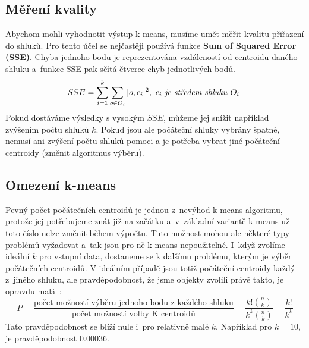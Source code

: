 \subsection{Měření kvality}
Abychom mohli vyhodnotit výstup k-means, musíme umět měřit kvalitu přiřazení do shluků. Pro tento účel se nejčastěji používá funkce \textbf{Sum of Squared Error (SSE)}. Chyba jednoho bodu je reprezentována vzdáleností od centroidu daného shluku a~funkce SSE pak sčítá čtverce chyb jednotlivých bodů.
\begin{equation}\label{eq:SSE}
SSE = \sum^k_{i=1}\sum_{o \in O_i}|o,c_i|^2, \textrm{ $c_i$ \textit{je středem shluku} $O_i$ }
\end{equation}
Pokud dostáváme výsledky s vysokým $SSE$, můžeme jej snížit například zvýšením počtu shluků $k$. Pokud jsou ale počáteční shluky vybrány špatně, nemusí ani zvýšení počtu shluků pomoci a je potřeba vybrat jiné počáteční centroidy (změnit algoritmus výběru).\\

\subsection{Omezení k-means} \label{ssec:kmeansrestrictions}
Pevný počet počátečních centroidů je jednou z~nevýhod k-means algoritmu, protože jej potřebujeme znát již na začátku a~v~základní variantě k-means už toto číslo nelze změnit během výpočtu. Tuto možnost mohou ale některé typy problémů vyžadovat a~tak jsou pro ně k-means nepoužitelné.  I~když zvolíme ideální $k$ pro vstupní data, dostaneme se k dalšímu problému, kterým je výběr počátečních centroidů. V ideálním případě jsou totiž počáteční centroidy každý z~jiného shluku, ale pravděpodobnost, že jsme objekty zvolili právě takto, je opravdu malá~\cite{Tan05}:
\begin{equation}\label{eq:centroidChooseProbability}
P = \frac{\mbox{počet možností výběru jednoho bodu z~každého shluku}}{\mbox{počet možností volby K~centroidů}}=\frac{k!{n \choose k}}{k^k {n \choose k} }=\frac{k!}{k^k}
\end{equation}
Tato pravděpodobnost se blíží nule i~pro relativně malé $k$. Například pro $k=10$, je pravděpodobnost $0.00036$. \\

